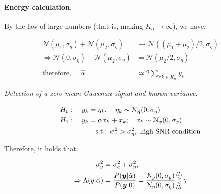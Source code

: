 \documentclass[17pt,a4paper]{extarticle}
\begin{document}
\paragraph{Energy calculation.}
 By the law of large numbers (that is, making $K_{\alpha}{\to} \infty$), we have:
\begin{linenomath*} 
	\begin{align*}
		\mathcal{N}(\mu_1,\sigma_{\eta})+\mathcal{N}(\mu_2,\sigma_{\eta}) &\to \mathcal{N}((\mu_1+\mu_2)/2,\sigma_{\eta})\\
		\Rightarrow\mathcal{N}(0,\sigma_{\eta})+\mathcal{N}(\mu_2,\sigma_{\eta}) &= \mathcal{N}(\mu_2/2,\sigma_{\eta})\\
		\\
		\textrm{therefore, }\quad{\hat{\alpha}}&\simeq 2 \sum_{\forall k \in K_{\alpha}}{y_k}
	\end{align*}
\end{linenomath*}

\textit{Detection of a zero-mean Gaussian signal and known variance:} 
\begin{linenomath*} 
	\begin{align*}	
		H_0:\quad y_k &= \eta_k,\quad \eta_k\sim \mathcal{N}_{{\boldsymbol {\eta}}}(0,\sigma_{\eta})\\
		H_1:\quad y_k &= \alpha x_k + x_k; \quad x_k\sim \mathcal{N}_{{\boldsymbol {x}}}(0,\sigma_{x})\\
		&\quad\textrm{s.t.: } \sigma^{2}_{x} > \sigma^{2}_{\eta},\textrm{ high SNR condition}
	\end{align*}
\end{linenomath*}

Therefore, it holds that:
\begin{linenomath*} 
	\begin{align*}
		\sigma^{2}_y&=\sigma^{2}_{a} + \sigma^{2}_{\eta},\\ 
		\Rightarrow\Lambda (y|\hat{\alpha}) &= \frac{P({\boldsymbol {y}}|\hat{\alpha})}{P({\boldsymbol {y}}|0)}   	= \frac{\mathcal{N}_{y}(0,\sigma_{y})}
		{\mathcal{N}_{\eta}(0,\sigma_{\eta})}\substack{H_1\\>\\<\\H_0} \gamma 
	\end{align*}
\end{linenomath*}
\end{document}

